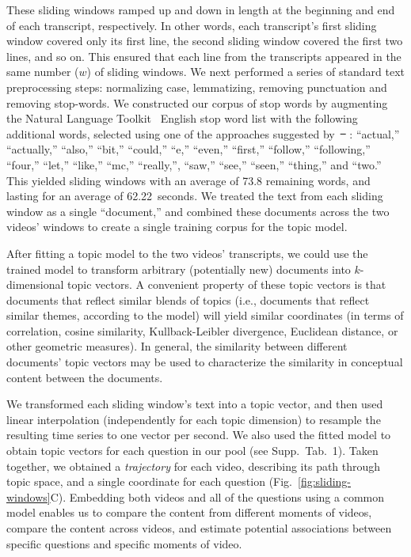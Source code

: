 \documentclass[10pt]{article}
\newcommand{\questions}{1}
\providecommand{\DIFaddtex}[1]{{\protect\color{blue}\uwave{#1}}} %
\providecommand{\DIFdeltex}[1]{{\protect\color{red}\sout{#1}}}                      %
\providecommand{\DIFaddbegin}{} %
\providecommand{\DIFaddend}{} %
\providecommand{\DIFdelbegin}{} %
\providecommand{\DIFdelend}{} %
\providecommand{\DIFadd}[1]{\texorpdfstring{\DIFaddtex{#1}}{#1}} %
\providecommand{\DIFdel}[1]{\texorpdfstring{\DIFdeltex{#1}}{}} %
\newcommand{\DIFscaledelfig}{0.5}
\newlength{\DIFdelgraphicswidth} %
\newlength{\DIFdelgraphicsheight} %
\newcommand{\DIFaddincludegraphics}[2][]{{\color{blue}\fbox{\DIFOincludegraphics[#1]{#2}}}} %
\newcommand{\DIFdelincludegraphics}[2][]{%
\sbox{\DIFdelgraphicsbox}{\DIFOincludegraphics[#1]{#2}}%
\settoboxwidth{\DIFdelgraphicswidth}{\DIFdelgraphicsbox} %
\settoboxtotalheight{\DIFdelgraphicsheight}{\DIFdelgraphicsbox} %
\scalebox{\DIFscaledelfig}{%
\parbox[b]{\DIFdelgraphicswidth}{\usebox{\DIFdelgraphicsbox}\\[-\baselineskip] \rule{\DIFdelgraphicswidth}{0em}}\llap{\resizebox{\DIFdelgraphicswidth}{\DIFdelgraphicsheight}{%
\setlength{\unitlength}{\DIFdelgraphicswidth}%
\begin{picture}(1,1)%
\thicklines\linethickness{2pt} %
{\color[rgb]{1,0,0}\put(0,0){\framebox(1,1){}}}%
{\color[rgb]{1,0,0}\put(0,0){\line( 1,1){1}}}%
{\color[rgb]{1,0,0}\put(0,1){\line(1,-1){1}}}%
\end{picture}%
}\hspace*{3pt}}} %
} %
\DeclareRobustCommand{\DIFaddbegin}{\DIFOaddbegin \let\includegraphics\DIFaddincludegraphics} %
\DeclareRobustCommand{\DIFaddend}{\DIFOaddend \let\includegraphics\DIFOincludegraphics} %
\DeclareRobustCommand{\DIFdelbegin}{\DIFOdelbegin \let\includegraphics\DIFdelincludegraphics} %
\DeclareRobustCommand{\DIFdelend}{\DIFOaddend \let\includegraphics\DIFOincludegraphics} %
\begin{document}
These sliding windows ramped up and down in length at the beginning and end of
each transcript, respectively. In other words, each transcript's first sliding
window covered only its first line, the second sliding window covered the first
two lines, and so on. This ensured that each line from the transcripts appeared
in the same number ($w$) of sliding windows. We next performed a series of
standard text preprocessing steps: normalizing case, lemmatizing, removing
punctuation and removing stop-words. We constructed our corpus of stop words by
augmenting the Natural Language Toolkit~\citep[NLTK; ][]{BirdEtal09} English
stop word list with the following additional words, selected using one of the
approaches suggested by~\DIFdelbegin \DIFdel{\mbox{%
\citep{BoydEtal14}}\hskip0pt%
}\DIFdelend \DIFaddbegin \DIFadd{\mbox{%
\citet{BoydEtal14}}\hskip0pt%
}\DIFaddend : ``actual,'' ``actually,'' ``also,''
``bit,'' ``could,'' ``e,'' ``even,'' ``first,'' ``follow,'' ``following,''
``four,'' ``let,'' ``like,'' ``mc,'' ``really,'', ``saw,'' ``see,'' ``seen,''
``thing,'' and ``two.'' This yielded sliding windows with an average of 73.8
remaining words, and lasting for an average of 62.22~seconds. We treated the
text from each sliding window as a single ``document,'' and combined these
documents across the two videos' windows to create a single training corpus for
the topic model.

After fitting a topic model to the two videos' transcripts, we could use the
trained model to transform arbitrary (potentially new) documents into
$k$-dimensional topic vectors. A convenient property of these topic vectors is
that documents that reflect similar blends of topics (i.e., documents that
reflect similar themes, according to the model) will yield similar coordinates
(in terms of correlation, cosine similarity, Kullback-Leibler divergence,
Euclidean distance, or other geometric measures). In general, the similarity
between different documents' topic vectors may be used to characterize the
similarity in conceptual content between the documents.

We transformed each sliding window's text into a topic vector, and then used
linear interpolation (independently for each topic dimension) to resample the
resulting time series to one vector per second. We also used the fitted model to
obtain topic vectors for each question in our pool (see Supp.~Tab.~\questions).
Taken together, we obtained a \textit{trajectory} for each video, describing
its path through topic space, and a single coordinate for each question
(Fig.~\ref{fig:sliding-windows}C). Embedding both videos and all of the
questions using a common model enables us to compare the content from different
moments of videos, compare the content across videos, and estimate potential
associations between specific questions and specific moments of video.
\end{document}
